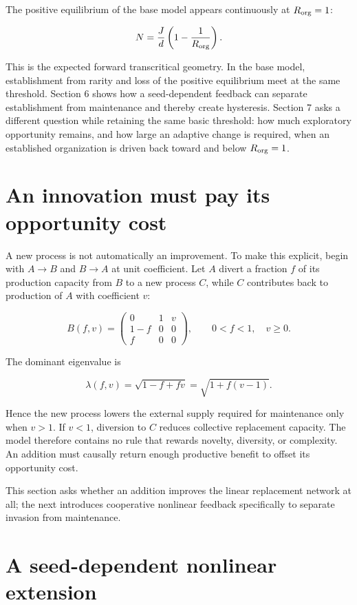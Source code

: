 \documentclass[11pt,a4paper]{article}
\begin{document}
The positive equilibrium of the base model appears continuously at
\(R_{\rm org} = 1\):

\[
N = \frac{J}{d}\left(1 - \frac{1}{R_{\rm org}}\right).
\]

This is the expected forward transcritical geometry. In the base model,
establishment from rarity and loss of the positive equilibrium meet at
the same threshold. Section 6 shows how a seed-dependent feedback can
separate establishment from maintenance and thereby create hysteresis.
Section 7 asks a different question while retaining the same basic
threshold: how much exploratory opportunity remains, and how large an
adaptive change is required, when an established organization is driven
back toward and below \(R_{\rm org}=1\).

\section{An innovation must pay its opportunity cost}

A new process is not automatically an improvement. To make this explicit, begin with $A\to B$ and $B\to A$ at unit coefficient. Let $A$ divert a fraction $f$ of its production capacity from $B$ to a new process $C$, while $C$ contributes back to production of $A$ with coefficient $v$:

\[
B(f,v)
=
\begin{pmatrix}
0 & 1 & v\\
1-f & 0 & 0\\
f & 0 & 0
\end{pmatrix},
\qquad
0<f<1,
\quad
v\geq0.
\]

The dominant eigenvalue is

\[
\lambda(f,v)
=
\sqrt{1-f+fv}
=
\sqrt{1+f(v-1)}.
\]

Hence the new process lowers the external supply required for maintenance only when $v>1$. If $v<1$, diversion to $C$ reduces collective replacement capacity. The model therefore contains no rule that rewards novelty, diversity, or complexity. An addition must causally return enough productive benefit to offset its opportunity cost.

This section asks whether an addition improves the linear replacement network at all; the next introduces cooperative nonlinear feedback specifically to separate invasion from maintenance.

\section{A seed-dependent nonlinear extension}
\end{document}
